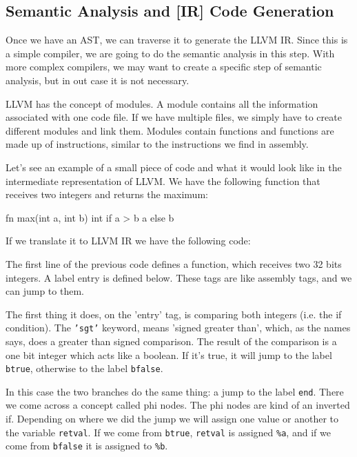 ﻿\documentclass[10pt,a4paper,twocolumn,twoside]{article}
\begin{document}
\subsection{Semantic Analysis and [IR] Code Generation}
Once we have an AST, we can traverse it to generate the LLVM IR. Since this is a
simple compiler, we are going to do the semantic analysis in this step. With 
more complex compilers, we may want to create a specific step of semantic 
analysis, but in out case it is not necessary.

LLVM has the concept of modules. A module contains all the information
associated with one code file. If we have multiple files, we simply have to
create different modules and link them. Modules contain functions and functions
are made up of instructions, similar to the instructions we find in assembly.

Let's see an example of a small piece of code and what it would look like in the
intermediate representation of LLVM. We have the following function that
receives two integers and returns the maximum:

\begin{code}
fn max(int a, int b) int {
    if a > b { a } else { b }
}
\end{code}

If we translate it to LLVM IR we have the following code:


The first line of the previous code defines a function, which receives two
32 bits integers. A label entry is defined below. These tags are like assembly
tags, and we can jump to them.

The first thing it does, on the 'entry' tag, is comparing both integers (i.e.
the if condition). The \texttt{'sgt'} keyword, means 'signed greater than',
which, as the names says, does a greater than signed comparison. The result of
the comparison is a one bit integer which acts like a boolean. If it's true, it
will jump to the label \texttt{btrue}, otherwise to the label \texttt{bfalse}.

In this case the two branches do the same thing: a jump to the label
\texttt{end}. There we come across a concept called phi nodes. The phi nodes
are kind of an inverted if. Depending on where we did the jump we will assign
one value or another to the variable \texttt{retval}. If we come from
\texttt{btrue}, \texttt{retval} is assigned \texttt{\%a}, and if we come from 
\texttt{bfalse} it is assigned to \texttt{\%b}.
\end{document}
